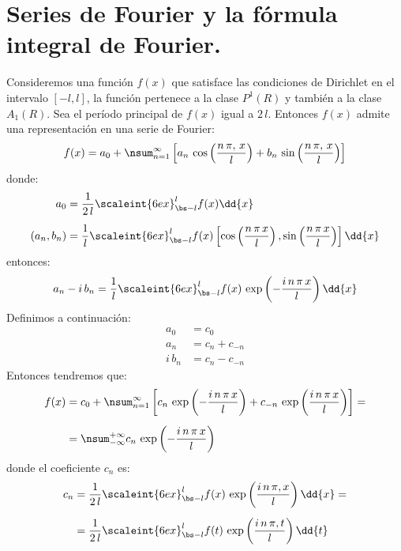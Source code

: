 
\section{Series de Fourier y la fórmula integral de Fourier.}

Consideremos una función $f (x)$ que satisface las condiciones de Dirichlet en el intervalo $[-l, l]$, la función pertenece a la clase $P^{1} (R)$ y también a la clase $A_{1} (R)$. Sea el período principal de $f (x)$ igual a $2 \, l$. Entonces $f (x)$ admite una representación en una serie de Fourier:
\begin{align*}
f (x) = a_{0} + \nsum_{n=1}^{\infty} \left[ a_{n} \, \cos \left( \dfrac{n \, \pi, \, x}{l}  \right) + b_{n} \, \sin \left( \dfrac{n \, \pi, \, x}{l}  \right) \right]
\end{align*}
donde:
\begin{align*}
a_{0} &= \dfrac{1}{2 \, l} \scaleint{6ex}_{\bs -l}^{l} f (x) \dd{x} \\[0.5em]
(a_{n}, b_{n}) &= \dfrac{1}{l} \scaleint{6ex}_{\bs -l}^{l} f (x) \left[ \cos \left( \dfrac{n \, \pi \, x}{l} \right), \sin \left( \dfrac{n \, \pi \, x}{l} \right) \right] \dd{x}
\end{align*}
entonces:
\begin{align*}
a_{n} - i \, b_{n} = \dfrac{1}{l} \scaleint{6ex}_{\bs -l}^{l} f (x) \, \exp \left( - \dfrac{i \, n \, \pi \, x}{l} \right) \dd{x}
\end{align*}
Definimos a continuación:
\begin{align*}
a_{0} &= c_{0} \\
a_{n} &= c_{n} + c_{-n} \\
i \, b_{n} &= c_{n} - c_{-n}
\end{align*}
Entonces tendremos que:
\begin{align}
\begin{aligned}[b]
f (x) &= c_{0} + \nsum_{n=1}^{\infty} \left[ c_{n} \, \exp \left( -\dfrac{i \, n \, \pi \, x}{l} \right) + c_{-n} \, \exp \left( \dfrac{i \, n \, \pi \, x}{l} \right) \right] = \\[0.5em]
&= \nsum_{-\infty}^{+\infty} c_{n} \, \exp \left( - \dfrac{i \, n \, \pi \, x}{l} \right)
\end{aligned}
\label{eq:ecuacion_01_02}
\end{align}
donde el coeficiente $c_{n}$ es:
\begin{align}
\begin{aligned}[b]
c_{n} &= \dfrac{1}{2 \, l} \scaleint{6ex}_{\bs -l}^{l} f (x) \, \exp \left( \dfrac{i \, n \, \pi, x}{l} \right) \dd{x} = \\[0.5em]
&= \dfrac{1}{2 \, l} \scaleint{6ex}_{\bs -l}^{l} f (t) \, \exp \left( \dfrac{i \, n \, \pi, t}{l} \right) \dd{t}
\end{aligned}
\label{eq:ecuacion_01_03}
\end{align}
